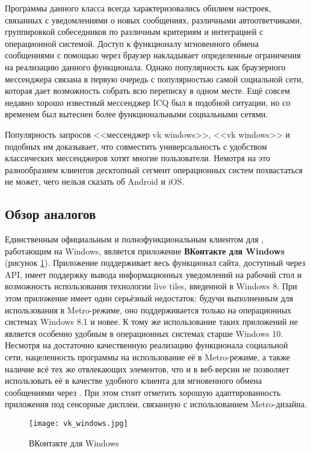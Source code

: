 Программы данного класса всегда характеризовались обилием настроек, связанных с
уведомлениями о новых сообщениях, различными автоответчиками, группировкой
собеседников по различным критериям и интеграцией с операционной системой.
Доступ к функционалу мгновенного обмена сообщениями с помощью \vk{} через
браузер накладывает определенные ограничения на реализацию данного функционала.
Однако популярность \vk{} как браузерного мессенджера связана в первую очередь с
популярностью самой социальной сети, которая дает возможность собрать всю
переписку в одном месте.
Ещё совсем недавно хорошо известный мессенджер ICQ был в подобной ситуации, но
со временем был вытеснен более функциональными социальными сетями.

Популярность запросов <<мессенджер vk windows>>, <<vk windows>> и подобных им
доказывает, что совместить универсальность \vk{} с удобством классических
мессенджеров хотят многие пользователи. Немотря на это разнообразием клиентов
десктопный сегмент операционных систем похвастаться не может, чего нельзя
сказать об Android и iOS.

\subsection{Обзор аналогов}

Единственным официальным и полнофункциональным клиентом для \vk{}, работающим на
Windows, является приложение \textbf{ВКонтакте для Windows} (рисунок
\ref{fig:vk_windows}). Приложение поддерживает весь функционал сайта, доступный
через API, имеет поддержку вывода информационных уведомлений на рабочий стол и
возможность использования технологии live tiles, введенной в Windows 8. При этом
приложение имеет один серьёзный недостаток:
будучи выполненным для использования в Metro-режиме, оно поддерживается только
на операционных системах Windows 8.1 и новее. К тому же использование таких
приложений не является особенно удобным в операционных системах старше Windows
10. Несмотря на достаточно качественную реализацию функционала социальной сети,
нацеленность программы на использование её в Metro-режиме, а также наличие всё
тех же отвлекающих элементов, что и в веб-версии не позволяет использовать её в
качестве удобного клиента для мгновенного обмена сообщениями через \vk{}. При
этом стоит отметить хорошую адаптированность приложения под сенсорные дисплеи,
связанную с использованием Metro-дизайна.

\begin{figure}[ht] 
\centering
    \texttt{[image: vk\_windows.jpg]}
    \caption{ВКонтакте для Windows}
  	\label{fig:vk_windows}
\end{figure}

